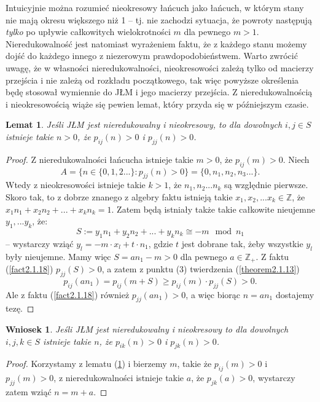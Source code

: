 \documentclass[a4paper]{article}
\theoremstyle{defn}
\theoremstyle{theorem}
\theoremstyle{lemma}
\newtheorem{lemma}[defn]{Lemat}
\theoremstyle{cor}
\newtheorem{cor}[defn]{Wniosek}
\theoremstyle{fact}
\begin{document}
Intuicyjnie można rozumieć nieokresowy łańcuch jako łańcuch, w którym stany nie mają okresu większego niż 1 – tj. nie zachodzi sytuacja, że powroty następują \textit{tylko} po upływie całkowitych wielokrotności $m$ dla pewnego $m>1$. Nieredukowalność jest natomiast wyrażeniem faktu, że z każdego stanu możemy dojść do każdego innego z niezerowym prawdopodobieństwem. Warto zwrócić uwagę, że w własności nieredukowalności, nieokresowości zależą tylko od macierzy przejścia i nie zależą od rozkładu początkowego, tak więc powyższe określenia będę stosował wymiennie do JŁM i jego macierzy przejścia. Z nieredukowalnością i nieokresowością wiąże się pewien lemat, który przyda się w późniejszym czasie.
\begin{lemma}\label{lemma2.1.19}
Jeśli JŁM jest nieredukowalny i nieokresowy, to dla dowolnych $i,j \in S$ istnieje takie $n > 0$, że $p_{ij}(n) > 0$ i $p_{jj}(n) > 0$.
\end{lemma}
\begin{proof}
Z nieredukowalności łańcucha istnieje takie $m > 0$, że $p_{ij}(m) > 0$.  Niech 
$$A = \{n \in \{0, 1, 2...\}:  p_{jj}(n) > 0\} = \{0, n_1, n_2, n_3 ... \}.$$ 
Wtedy z nieokresowości istnieje takie $k > 1$, że $n_1, n_2... n_k$ są względnie pierwsze. Skoro tak, to z dobrze znanego z algebry faktu \cite{bezout} istnieją takie $x_1, x_2, ... x_k \in \mathbb{Z}$, że $x_1n_1 + x_2n_2 + ... + x_k n_k = 1$.  Zatem będą istniały także takie całkowite nieujemne $ y_1, ... y_k$, że: 
$$S := y_1n_1 + y_2n_2 + ... + y_k n_k \cong -m \mod n_1$$ 
– wystarczy wziąć $y_l = -m \cdot x_l + t \cdot n_1$, gdzie $t$ jest dobrane tak, żeby wszystkie $y_l$ były nieujemne. Mamy więc $S = an_1 - m > 0$ dla pewnego $a \in \mathbb{Z}_+$. Z faktu (\ref{fact2.1.18}) $p_{jj}(S) > 0$, a zatem z punktu (3) twierdzenia (\ref{theorem2.1.13})  $$p_{ij}(an_1) = p_{ij}(m + S) \geq p_{ij}(m)\cdot p_{jj}(S) > 0.$$ 
Ale z faktu (\ref{fact2.1.18}) również $p_{jj}(an_1) > 0$, a więc biorąc $n = an_1$ dostajemy tezę.
\end{proof}

\begin{cor}\label{cor2.1.20}
Jeśli JŁM jest nieredukowalny i nieokresowy to dla dowolnych $i,j,k \in S$ istnieje takie $n$, że $p_{ik}(n) > 0$ i $p_{jk}(n) > 0$.
\end{cor}
\begin{proof}
Korzystamy z lematu (\ref{lemma2.1.19}) i bierzemy $m$, takie że $p_{ij}(m) > 0$ i $p_{jj}(m) > 0$, z nieredukowalności istnieje takie $a$, że $p_{jk}(a) > 0$, wystarczy zatem wziąć $n = m + a$.
\end{proof}
\end{document}
